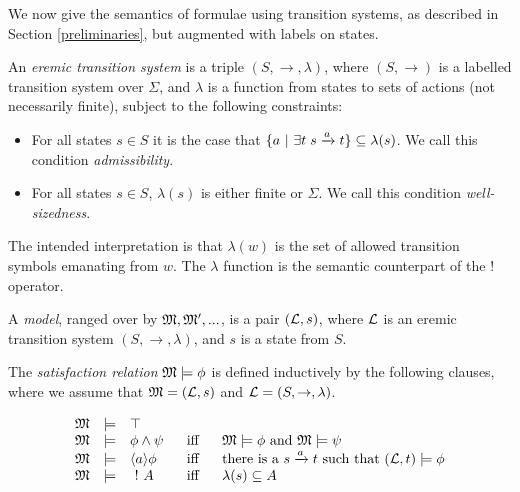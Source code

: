 \NI We now give the semantics of \ELABR{} formulae using
transition systems, as described in Section \ref{preliminaries}, but
augmented with labels on states.

\begin{definition}
An \emph{eremic transition system} is a triple $(S, \rightarrow,
\lambda)$, where $(S, \rightarrow)$ is a labelled transition system
over $\Sigma$, and $\lambda$ is a function from states to sets of
actions (not necessarily finite), subject to the following constraints:
\begin{itemize}

\item For all states $s \in S$ it is the case that $ \{a \ | \  \exists
  t \; s \xrightarrow{a} t\} \subseteq \lambda(s)$. We call this
  condition \emph{admissibility}.

\item For all states $s \in S$, $\lambda (s)$ is either finite or
  $\Sigma$. We call this condition \emph{well-sizedness}.

\end{itemize}

\end{definition}

\NI The intended interpretation is that $\lambda(w)$ is the set of
allowed transition symbols emanating from $w$.  The $\lambda$ function
is the semantic counterpart of the $!$ operator. 


\begin{definition}
A \emph{model}, ranged over by $\frak{M}, \frak{M}', ...$, is a pair $(\mathcal{L},
s)$, where $\mathcal{L}$ is an eremic transition system $(S, \rightarrow,
\lambda)$, and $s$ is a state from $S$.
\end{definition}



\begin{definition}
The \emph{satisfaction relation} $\frak{M} \models \phi$ is defined
inductively by the following clauses, where we assume that $\frak{M} =
(\mathcal{L}, s)$ and $\mathcal{L} = (S, \rightarrow, \lambda)$.

\[
\begin{array}{lclcl}
  \frak{M} & \models & \top   \\
  \frak{M} & \models & \phi \land \psi &\ \mbox{ iff } \ & \frak{M}  \models \phi \mbox { and } \frak{M} \models \psi  \\
  \frak{M} & \models & \langle a \rangle \phi & \mbox{ iff } & \text{there is a } s \xrightarrow{a} t \mbox { such that } (\mathcal{L}, t) \models \phi  \\
  \frak{M} & \models & \ ! \  A &\mbox{ iff } & \lambda(s) \subseteq A
\end{array}
\]

\end{definition}

